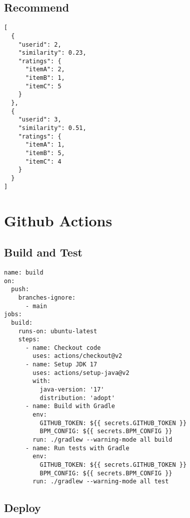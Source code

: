 \subsection{Recommend}

\begin{verbatim}
[
  {
    "userid": 2,
    "similarity": 0.23,
    "ratings": {
      "itemA": 2,
      "itemB": 1,
      "itemC": 5
    }
  },
  {
    "userid": 3,
    "similarity": 0.51,
    "ratings": {
      "itemA": 1,
      "itemB": 5,
      "itemC": 4
    }
  }
]
\end{verbatim}
\label{code:user_sim_json}

\section{Github Actions}

\subsection{Build and Test}
\begin{verbatim}
name: build
on:
  push:
    branches-ignore:
      - main
jobs:
  build:
    runs-on: ubuntu-latest
    steps:
      - name: Checkout code
        uses: actions/checkout@v2
      - name: Setup JDK 17
        uses: actions/setup-java@v2
        with:
          java-version: '17'
          distribution: 'adopt'
      - name: Build with Gradle
        env:
          GITHUB_TOKEN: ${{ secrets.GITHUB_TOKEN }}
          BPM_CONFIG: ${{ secrets.BPM_CONFIG }}
        run: ./gradlew --warning-mode all build
      - name: Run tests with Gradle
        env:
          GITHUB_TOKEN: ${{ secrets.GITHUB_TOKEN }}
          BPM_CONFIG: ${{ secrets.BPM_CONFIG }}
        run: ./gradlew --warning-mode all test
\end{verbatim}
\label{code:github_build_and_test}

\subsection{Deploy}

